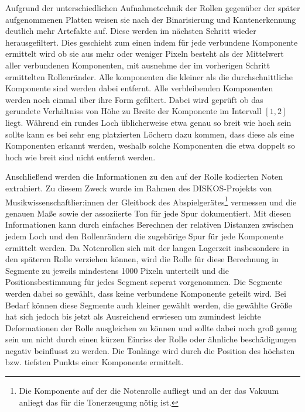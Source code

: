Aufgrund der unterschiedlichen Aufnahmetechnik der Rollen gegenüber der später aufgenommenen Platten weisen sie nach der Binarisierung und Kantenerkennung deutlich mehr Artefakte auf.
Diese werden im nächsten Schritt wieder herausgefiltert.
Dies geschieht zum einen indem für jede verbundene Komponente ermittelt wird ob sie aus mehr oder weniger Pixeln besteht als der Mittelwert aller verbundenen Komponenten, mit ausnehme der im vorherigen Schritt ermittelten Rollenränder.
Alle komponenten die kleiner als die durchschnittliche Komponente sind werden dabei entfernt.
Alle verbleibenden Komponenten werden noch einmal über ihre Form gefiltert.
Dabei wird geprüft ob das gerundete Verhältniss von Höhe zu Breite der Komponente im Intervall $[1,2]$ liegt.
Während ein rundes Loch üblicherweise etwa genau so breit wie hoch sein sollte kann es bei sehr eng platzierten Löchern dazu kommen, dass diese als eine Komponenten erkannt werden, weshalb solche Komponenten die etwa doppelt so hoch wie breit sind nicht entfernt werden.

Anschließend werden die Informationen zu den auf der Rolle kodierten Noten extrahiert.
Zu diesem Zweck wurde im Rahmen des DISKOS-Projekts von Musikwissenschaftlier:innen der Gleitbock des Abspielgerätes\footnote{Die Komponente auf der die Notenrolle aufliegt und an der das Vakuum anliegt das für die Tonerzeugung nötig ist.} vermessen und die genauen Maße sowie der assoziierte Ton für jede Spur dokumentiert.
Mit diesen Informationen kann durch einfaches Berechnen der relativen Distanzen zwischen jedem Loch und den Rollenrändern die zugehörige Spur für jede Komponente ermittelt werden.
Da Notenrollen sich mit der langen Lagerzeit insbesondere in den späteren Rolle verziehen können, wird die Rolle für diese Berechnung in Segmente zu jeweils mindestens 1000 Pixeln unterteilt und die Positionsbestimmung für jedes Segment seperat vorgenommen.
Die Segmente werden dabei so gewählt, dass keine verbundene Komponente geteilt wird.
Bei Bedarf können diese Segmente auch kleiner gewählt werden, die gewählte Größe hat sich jedoch bis jetzt als Ausreichend erwiesen um zumindest leichte Deformationen der Rolle ausgleichen zu können und sollte dabei noch groß genug sein um nicht durch einen kürzen Einriss der Rolle oder ähnliche beschädigungen negativ beinflusst zu werden.
Die Tonlänge wird durch die Position des höchsten bzw. tiefsten Punkts einer Komponente ermittelt.

